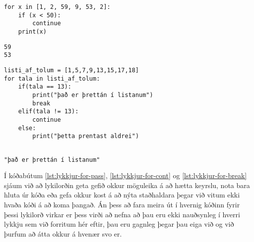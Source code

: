 \lstset{style=venjulegt}
\begin{lstlisting}[caption=Lykilorðið continue notað með for lykkju, label=lst:lykkjur-for-cont]
for x in [1, 2, 59, 9, 53, 2]:
	if (x < 50):
		continue
	print(x)
\end{lstlisting}
\lstset{style=uttak}
\begin{lstlisting}
59
53
\end{lstlisting}
\lstset{style=venjulegt}
\begin{lstlisting}[caption=Lykilorðið continue notað með for lykkju, label=lst:lykkjur-for-break]
listi_af_tolum = [1,5,7,9,13,15,17,18]
for tala in listi_af_tolum:
	if(tala == 13):
		print("það er þrettán í listanum")
		break
	elif(tala != 13):
		continue
	else:
		print("þetta prentast aldrei")
		
\end{lstlisting}
\lstset{style=uttak}
\begin{lstlisting}
"það er þrettán í listanum"
\end{lstlisting}
\lstset{style=venjulegt}
Í kóðabútum \ref{lst:lykkjur-for-pass}, \ref{lst:lykkjur-for-cont} og \ref{lst:lykkjur-for-break} sjáum við að lykilorðin geta gefið okkur möguleika á að hætta keyrslu, nota bara hluta úr kóða eða gefa okkur kost á að nýta staðhaldara þegar við vitum ekki hvaða kóði á að koma þangað.
Án þess að fara meira út í hvernig kóðinn fyrir þessi lykilorð virkar er þess virði að nefna að þau eru ekki nauðsynleg í hverri lykkju sem við forritum hér eftir, þau eru gagnleg þegar þau eiga við og við þurfum að átta okkur á hvenær svo er.


